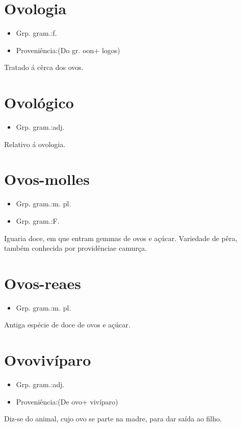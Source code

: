 \section{Ovologia}
\begin{itemize}
\item {Grp. gram.:f.}
\end{itemize}
\begin{itemize}
\item {Proveniência:(Do gr. \textunderscore oon\textunderscore  + \textunderscore logos\textunderscore )}
\end{itemize}
Tratado á cêrca dos ovos.
\section{Ovológico}
\begin{itemize}
\item {Grp. gram.:adj.}
\end{itemize}
Relativo á ovologia.
\section{Ovos-molles}
\begin{itemize}
\item {Grp. gram.:m. pl.}
\end{itemize}
\begin{itemize}
\item {Grp. gram.:F.}
\end{itemize}
Iguaria doce, em que entram gemmas de ovos e açúcar.
Variedade de pêra, também conhecida por \textunderscore providência\textunderscore  e \textunderscore camurça\textunderscore .
\section{Ovos-reaes}
\begin{itemize}
\item {Grp. gram.:m. pl.}
\end{itemize}
Antiga espécie de doce de ovos e açúcar.
\section{Ovovivíparo}
\begin{itemize}
\item {Grp. gram.:adj.}
\end{itemize}
\begin{itemize}
\item {Proveniência:(De \textunderscore ovo\textunderscore  + \textunderscore vivíparo\textunderscore )}
\end{itemize}
Diz-se do animal, cujo ovo se parte na madre, para dar saída ao filho.
